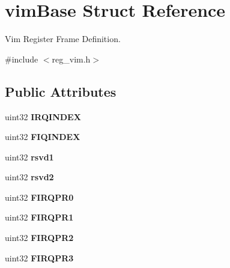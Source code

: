 \hypertarget{structvimBase}{}\section{vim\+Base Struct Reference}
\label{structvimBase}


Vim Register Frame Definition.  




{\ttfamily \#include $<$reg\+\_\+vim.\+h$>$}

\subsection*{Public Attributes}
\begin{DoxyCompactItemize}
\item 
\mbox{\label{structvimBase_a157768aa07bdc3c2caca859e3af4b4ac}} 
uint32 {\bfseries I\+R\+Q\+I\+N\+D\+EX}
\item 
\mbox{\label{structvimBase_a9e249650e8608df8f57210cca52df504}} 
uint32 {\bfseries F\+I\+Q\+I\+N\+D\+EX}
\item 
\mbox{\label{structvimBase_a661260ea7533b64bbf51b863f853ac2d}} 
uint32 {\bfseries rsvd1}
\item 
\mbox{\label{structvimBase_a648003f400919248253ff3d5b47e8bb1}} 
uint32 {\bfseries rsvd2}
\item 
\mbox{\label{structvimBase_a9f54f8c0b1b15346f6fee80765222dba}} 
uint32 {\bfseries F\+I\+R\+Q\+P\+R0}
\item 
\mbox{\label{structvimBase_aef106fcdedf8ffe7d65de29bdd7fd1b0}} 
uint32 {\bfseries F\+I\+R\+Q\+P\+R1}
\item 
\mbox{\label{structvimBase_a97858acc75cd65f5db3a4a34b8d31145}} 
uint32 {\bfseries F\+I\+R\+Q\+P\+R2}
\item 
\mbox{\label{structvimBase_afe286d3a0969962c38219e561d49494d}} 
uint32 {\bfseries F\+I\+R\+Q\+P\+R3}
\item 
\mbox{\label{structvimBase_a8712a4e17c9936045c64cff8553d7008}} 

\end{DoxyCompactItemize}
